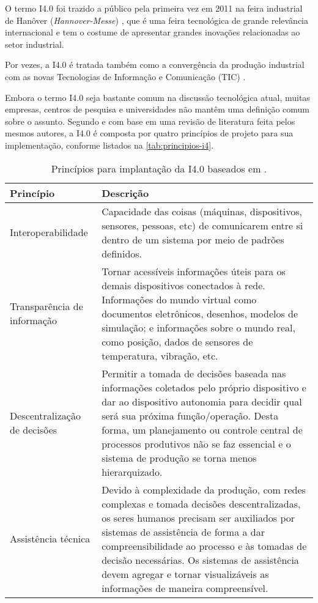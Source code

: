 	O termo I4.0 foi trazido a público pela primeira vez em 2011 na feira industrial de Hanôver (\textit{Hannover-Messe}) \cite{kagermann2011industrie}, que é uma feira tecnológica de grande relevância internacional e tem o costume de apresentar grandes inovações relacionadas ao setor industrial.

	Por vezes, a I4.0 é tratada também como a convergência da produção industrial com as novas Tecnologias de Informação e Comunicação (TIC) \cite{hermann2016design}.
	
	Embora o termo I4.0 seja bastante comum na discussão tecnológica atual, muitas empresas, centros de pesquisa e universidades não mantêm uma definição comum sobre o assunto. Segundo  e com base em uma revisão de literatura feita pelos mesmos autores, a I4.0 é composta por quatro princípios de projeto para sua implementação, conforme listados na \autoref{tab:principios-i4}.
	
	\begin{table}[htb]
		\centering
		\footnotesize
		\caption{Princípios para implantação da I4.0 baseados em .}
		\label{tab:principios-i4}
		\begin{tabular}{p{3cm}p{12cm}}
			\hline
			\textbf{Princípio} & \textbf{Descrição} \\
			
			\hline
			Interoperabilidade &
			Capacidade das coisas (máquinas, dispositivos, sensores, pessoas, etc) de comunicarem entre si dentro de um sistema por meio de padrões definidos. \\
			
			\hline
			Transparência de informação &
			Tornar acessíveis informações úteis para os demais dispositivos conectados à rede. Informações do mundo virtual como documentos eletrônicos, desenhos, modelos de simulação; e informações sobre o mundo real, como posição, dados de sensores de temperatura, vibração, etc. \\
			
			\hline
			Descentralização de decisões &
			Permitir a tomada de decisões baseada nas informações coletados pelo próprio dispositivo e dar ao dispositivo autonomia para decidir qual será sua próxima função/operação. Desta forma, um planejamento ou controle central de processos produtivos não se faz essencial e o sistema de produção se torna menos hierarquizado. \\
			
			\hline
			Assistência técnica &
			Devido à complexidade da produção, com redes complexas e tomada decisões descentralizadas, os seres humanos precisam ser auxiliados por sistemas de assistência de forma a dar compreensibilidade ao processo e às tomadas de decisão necessárias. Os sistemas de assistência devem agregar e tornar visualizáveis as informações de maneira compreensível. \\
			
			\hline
		\end{tabular}
	\end{table}

